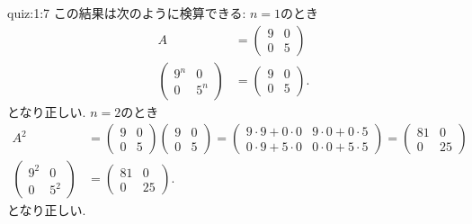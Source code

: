 \begin{answerof}{quiz:1:7}
  この結果は次のように検算できる:
  $n=1$のとき
\begin{align*}
  A&=\begin{pmatrix}9&0\\0&5\end{pmatrix}\\
  \begin{pmatrix}9^n&0\\0&5^n\end{pmatrix}&=\begin{pmatrix}9&0\\0&5\end{pmatrix}.
\end{align*}
となり正しい.
  $n=2$のとき
\begin{align*}
  A^2&=\begin{pmatrix}9&0\\0&5\end{pmatrix}\begin{pmatrix}9&0\\0&5\end{pmatrix}
    =\begin{pmatrix}9\cdot 9+0\cdot 0&9\cdot 0+0\cdot5 \\0\cdot 9+5\cdot 0&0\cdot 0+5\cdot 5\end{pmatrix}
    =\begin{pmatrix}81&0\\0&25\end{pmatrix}
  \\
  \begin{pmatrix}9^2&0\\0&5^2\end{pmatrix}&=\begin{pmatrix}81&0\\0&25\end{pmatrix}.
\end{align*}
となり正しい.  
\end{answerof}


